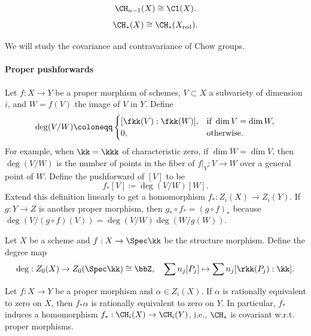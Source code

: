     \begin{example}
        \[ \CH_{n-1}(X) \cong \Cl(X). \]
        \[ \CH_{*}(X) \cong \CH_*(X_{\text{red}}). \]
    \end{example}

    We will study the covariance and contravariance of Chow groups.

    \paragraph{Proper pushforwards}
    Let \(f: X \to Y\) be a proper morphism of schemes, \(V \subset X\) a subvariety of dimension \(i\), and \(W = f(V)\) the image of \(V\) in \(Y\). 
    Define 
    \[ \deg(V/W) \coloneqq \begin{cases}
        [\fkk(V):\fkk(W)], & \text{if } \dim V = \dim W, \\
        0, & \text{otherwise}.
    \end{cases} \]
    For example, when \(\kk=\kkk\) of characteristic zero, if \(\dim W = \dim V\), then \(\deg(V/W)\) is the number of points in the fiber of \(f|_V: V \to W\) over a general point of \(W\).
    Define the pushforward of \([V]\) to be
    \[ f_*[V] \coloneqq \deg(V/W) [W]. \]
    Extend this definition linearly to get a homomorphism \(f_*: Z_i(X) \to Z_i(Y)\). 
    If \(g: Y \to Z\) is another proper morphism, then \(g_* \circ f_* = (g \circ f)_*\) because \(\deg(V/(g \circ f)(V)) = \deg(V/W) \deg(W/g(W))\).

    \begin{example}
        Let \(X\) be a scheme and \(f:X \to \Spec \kk\) be the structure morphism. 
        Define the degree map
        \[ \deg: Z_0(X) \to Z_0(\Spec \kk) \cong \bbZ, \quad \sum n_j [P_j] \mapsto \sum n_j [\rkk(P_j):\kk]. \]
    \end{example}

    \begin{theorem}
        Let \(f: X \to Y\) be a proper morphism and \(\alpha \in Z_i(X)\).
        If \(\alpha\) is rationally equivalent to zero on \(X\), then \(f_*\alpha\) is rationally equivalent to zero on \(Y\).
        In particular, \(f_*\) induces a homomorphism \(f_*: \CH_i(X) \to \CH_i(Y)\), i.e., \(\CH_*\) is covariant w.r.t. proper morphisms.
    \end{theorem}
